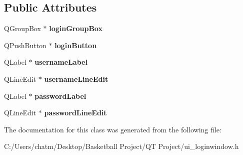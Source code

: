 \subsection*{Public Attributes}
\begin{DoxyCompactItemize}
\item 
\mbox{\label{class_ui___login_window_a68ed6094e9a155151988d3063fda01b9}} 
Q\+Group\+Box $\ast$ {\bfseries login\+Group\+Box}
\item 
\mbox{\label{class_ui___login_window_a09edcb5fc16a3ebe02caa58c805881ce}} 
Q\+Push\+Button $\ast$ {\bfseries login\+Button}
\item 
\mbox{\label{class_ui___login_window_a9595f2c0be7d47ee8d3de1b795d6946d}} 
Q\+Label $\ast$ {\bfseries username\+Label}
\item 
\mbox{\label{class_ui___login_window_a5f0e5d18fc9c536647aed75348b1305f}} 
Q\+Line\+Edit $\ast$ {\bfseries username\+Line\+Edit}
\item 
\mbox{\label{class_ui___login_window_ac7e65686283e30b9bbb24dfe6c9d7123}} 
Q\+Label $\ast$ {\bfseries password\+Label}
\item 
\mbox{\label{class_ui___login_window_a7ca08bc4b2faa0481c83d588baba7a43}} 
Q\+Line\+Edit $\ast$ {\bfseries password\+Line\+Edit}
\end{DoxyCompactItemize}


The documentation for this class was generated from the following file\+:\begin{DoxyCompactItemize}
\item 
C\+:/\+Users/chatm/\+Desktop/\+Basketball Project/\+Q\+T Project/ui\+\_\+loginwindow.\+h\end{DoxyCompactItemize}
